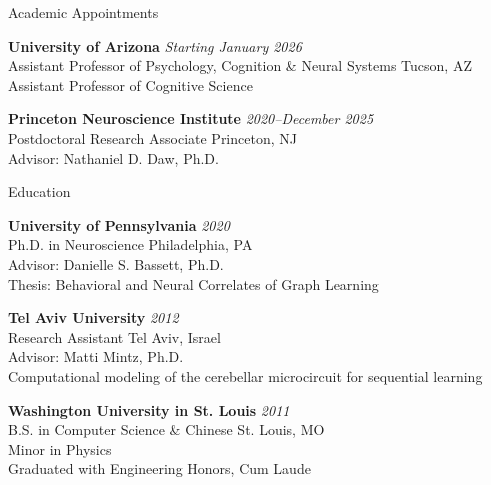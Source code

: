 \documentclass{resume} %
\begin{document}

\begin{rSection}{Academic Appointments}

\textbf{University of Arizona} \hfill \emph{Starting January 2026} \\
Assistant Professor of Psychology, Cognition \& Neural Systems \hfill Tucson, AZ \\
Assistant Professor of Cognitive Science

\textbf{Princeton Neuroscience Institute} \hfill \emph{2020--December 2025} \\
Postdoctoral Research Associate \hfill Princeton, NJ \\
Advisor: Nathaniel D. Daw, Ph.D.

\end{rSection}


\begin{rSection}{Education}

\textbf{University of Pennsylvania} \hfill \emph{2020} \\
Ph.D. in Neuroscience \hfill Philadelphia, PA \\
Advisor: Danielle S. Bassett, Ph.D. \\
Thesis: Behavioral and Neural Correlates of Graph Learning

\textbf{Tel Aviv University} \hfill \emph{2012} \\
Research Assistant \hfill Tel Aviv, Israel \\
Advisor: Matti Mintz, Ph.D. \\
Computational modeling of the cerebellar microcircuit for sequential learning

\textbf{Washington University in St. Louis} \hfill \emph{2011} \\
B.S. in Computer Science \& Chinese \hfill St. Louis, MO \\
Minor in Physics \\
Graduated with Engineering Honors, Cum Laude

\end{rSection}

\end{document}
